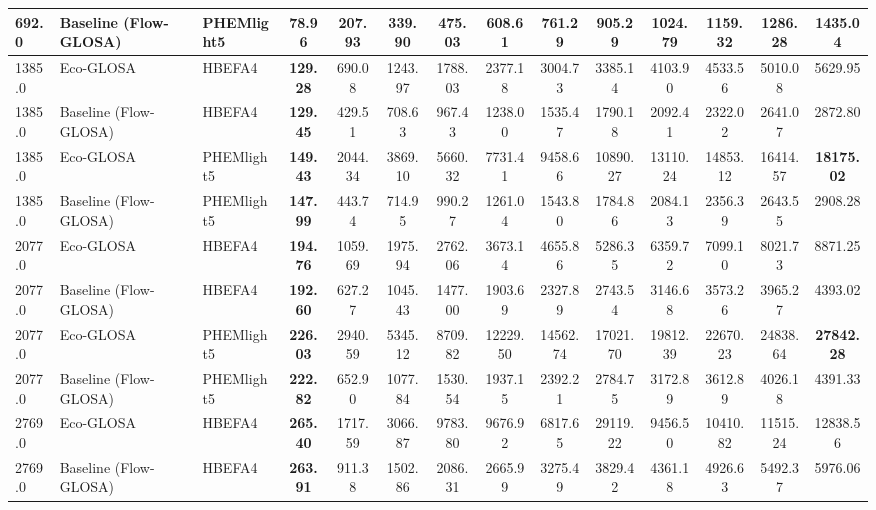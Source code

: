 \begin{table}[htb]
{\begin{tabular}{l l l *{11}{c}}
      692.0 & Baseline (Flow-GLOSA)      & PHEMlight5   & \textbf{78.96}      & 207.93     & 339.90     & 475.03     & 608.61     & 761.29     & 905.29     & 1024.79    & 1159.32    & 1286.28    & 1435.04    \\
      \midrule
      1385.0& Eco-GLOSA                  & HBEFA4       & \textbf{129.28}     & 690.08     & 1243.97    & 1788.03    & 2377.18    & 3004.73    & 3385.14    & 4103.90    & 4533.56    & 5010.08    & 5629.95    \\
      1385.0& Baseline (Flow-GLOSA)      & HBEFA4       & \textbf{129.45}     & 429.51 & 708.63     & 967.43     & 1238.00    & 1535.47    & 1790.18    & 2092.41    & 2322.02    & 2641.07    & 2872.80    \\
      1385.0& Eco-GLOSA                  & PHEMlight5   & \textbf{149.43}     & 2044.34    & 3869.10    & 5660.32    & 7731.41    & 9458.66    & 10890.27   & 13110.24   & 14853.12   & 16414.57   & \textbf{18175.02} \\
      1385.0& Baseline (Flow-GLOSA)      & PHEMlight5   & \textbf{147.99}     & 443.74     & 714.95     & 990.27     & 1261.04    & 1543.80    & 1784.86    & 2084.13    & 2356.39    & 2643.55    & 2908.28    \\
      \midrule
      2077.0& Eco-GLOSA                  & HBEFA4       & \textbf{194.76}     & 1059.69    & 1975.94    & 2762.06    & 3673.14    & 4655.86    & 5286.35    & 6359.72    & 7099.10    & 8021.73    & 8871.25    \\
      2077.0& Baseline (Flow-GLOSA)      & HBEFA4       & \textbf{192.60}     & 627.27 & 1045.43    & 1477.00    & 1903.69    & 2327.89    & 2743.54    & 3146.68    & 3573.26    & 3965.27    & 4393.02    \\
      2077.0& Eco-GLOSA                  & PHEMlight5   & \textbf{226.03}     & 2940.59    & 5345.12    & 8709.82    & 12229.50   & 14562.74   & 17021.70   & 19812.39   & 22670.23   & 24838.64   & \textbf{27842.28} \\
      2077.0& Baseline (Flow-GLOSA)      & PHEMlight5   & \textbf{222.82}     & 652.90     & 1077.84    & 1530.54    & 1937.15    & 2392.21    & 2784.75    & 3172.89    & 3612.89    & 4026.18    & 4391.33    \\
      \midrule
      2769.0& Eco-GLOSA                  & HBEFA4       & \textbf{265.40}     & 1717.59    & 3066.87    & 9783.80 & 9676.92    & 6817.65    & 29119.22 & 9456.50    & 10410.82   & 11515.24   & 12838.56   \\
      2769.0& Baseline (Flow-GLOSA)      & HBEFA4       & \textbf{263.91}     & 911.38     & 1502.86    & 2086.31    & 2665.99    & 3275.49    & 3829.42    & 4361.18    & 4926.63    & 5492.37    & 5976.06    \\

\end{tabular}}
\end{table}
